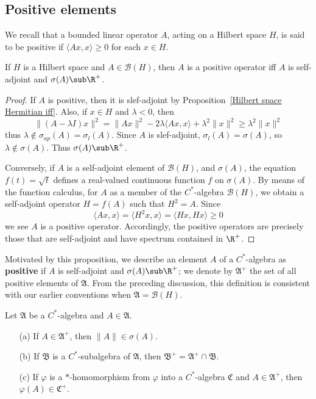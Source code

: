 \subsection{Positive elements}
We recall that a bounded linear operator $A$, acting on a Hilbert space $H$, is said to be positive if $\langle Ax,x\rangle\geq 0$ for each $x\in H$.
\begin{proposition}\label{Hilbert space positive operator iff}
If $H$ is a Hilbert space and $A\in\mathcal{B}(H)$, then $A$ is a positive operator iff $A$ is self-adjoint and $\sigma(A)\sub\R^+$. 
\end{proposition}
\begin{proof}
If $A$ is positive, then it is slef-adjoint by Proposition~\ref{Hilbert space Hermitian iff}. Also, if $x\in H$ and $\lambda<0$, then
\[\|(A-\lambda I)x\|^2=\|Ax\|^2-2\lambda\langle Ax,x\rangle+\lambda^2\|x\|^2\geq\lambda^2\|x\|^2\]
thus $\lambda\notin\sigma_{ap}(A)=\sigma_l(A)$. Since $A$ is slef-adjoint, $\sigma_l(A)=\sigma(A)$, so $\lambda\notin\sigma(A)$. Thus $\sigma(A)\sub\R^+$.\par
Conversely, if $A$ is a self-adjoint element of $\mathcal{B}(H)$, and $\sigma(A)$, the equation $f(t)=\sqrt{t}$ defines a real-valued continuous function $f$ on $\sigma(A)$. By means of the function calculus, for $A$ as a member of the $C^*$-algebra $\mathcal{B}(H)$, we obtain a self-adjoint operator $H=f(A)$ such that $H^2=A$. Since
\[\langle Ax,x\rangle=\langle H^2x,x\rangle=\langle Hx,Hx\rangle\geq 0\]
we see $A$ is a positive operator. Accordingly, the positive operators are precisely those that are self-adjoint and have spectrum contained in $\R^+$.
\end{proof}
Motivated by this proposition, we describe an element $A$ of a $C^*$-algebra as \textbf{positive} if $A$ is self-adjoint and $\sigma(A)\sub\R^+$; we denote by $\mathfrak{A}^+$ the set of all positive elements of $\mathfrak{A}$. From the preceding discussion, this definition is consistent with our earlier conventions when $\mathfrak{A}=\mathcal{B}(H)$.
\begin{proposition}\label{C^* algebra positive element prop}
Let $\mathfrak{A}$ be a $C^*$-algebra and $A\in\mathfrak{A}$.
\begin{itemize}
\item[(a)] If $A\in\mathfrak{A}^+$, then $\|A\|\in\sigma(A)$.
\item[(b)] If $\mathfrak{B}$ is a $C^*$-subalgebra of $\mathfrak{A}$, then $\mathfrak{B}^+=\mathfrak{A}^+\cap\mathfrak{B}$.
\item[(c)] If $\varphi$ is a $*$-homomorphism from $\varphi$ into a $C^*$-algebra $\mathfrak{C}$ and $A\in\mathfrak{A}^+$, then $\varphi(A)\in\mathfrak{C}^+$.
\end{itemize}
\end{proposition}
